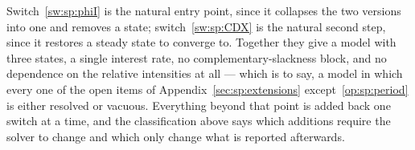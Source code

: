  Switch~\ref{sw:sp:phiI} is the natural entry
point, since it collapses the two versions into one and removes a state; switch~\ref{sw:sp:CDX} is the
natural second step, since it restores a steady state to converge to. Together they give a model with
three states, a single interest rate, no complementary-slackness block, and no dependence on the
relative intensities at all --- which is to say, a model in which every one of the open items of
Appendix~\ref{sec:sp:extensions} except~\ref{op:sp:period} is either resolved or vacuous. Everything
beyond that point is added back one switch at a time, and the classification above says which
additions require the solver to change and which only change what is reported afterwards.
